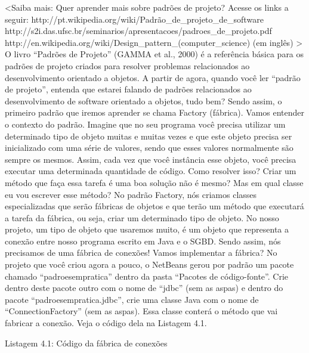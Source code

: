 <Saiba mais:
Quer aprender mais sobre padrões de projeto? Acesse os links a seguir:
http://pt.wikipedia.org/wiki/Padrão\_de\_projeto\_de\_software
http://s2i.das.ufsc.br/seminarios/apresentacoes/padroes\_de\_projeto.pdf
http://en.wikipedia.org/wiki/Design\_pattern\_(computer\_science) (em inglês)
>
O livro “Padrões de Projeto” (GAMMA et al., 2000) é a referência básica para os padrões de projeto criados para resolver problemas relacionados ao desenvolvimento orientado a objetos. A partir de agora, quando você ler “padrão de projeto”, entenda que estarei falando de padrões relacionados ao desenvolvimento de software orientado a objetos, tudo bem? Sendo assim, o primeiro padrão que iremos aprender se chama Factory (fábrica). 
Vamos entender o contexto do padrão. Imagine que no seu programa você precisa utilizar um determinado tipo de objeto muitas e muitas vezes e que este objeto precisa ser inicializado com uma série de valores, sendo que esses valores normalmente são sempre os mesmos. Assim, cada vez que você instância esse objeto, você precisa executar uma determinada quantidade de código. Como resolver isso? Criar um método que faça essa tarefa é uma boa solução não é mesmo? Mas em qual classe eu vou escrever esse método? No padrão Factory, nós criamos classes especializadas que serão fábricas de objetos e que terão um método que executará a tarefa da fábrica, ou seja, criar um determinado tipo de objeto.
No nosso projeto, um tipo de objeto que usaremos muito, é um objeto que representa a conexão entre nosso programa escrito em Java e o SGBD. Sendo assim, nós precisamos de uma fábrica de conexões! Vamos implementar a fábrica? No projeto que você criou agora a pouco, o NetBeans gerou por padrão um pacote chamado “padroesempratica” dentro da pasta “Pacotes de código-fonte”. Crie dentro deste pacote outro com o nome de “jdbc” (sem as aspas) e dentro do pacote “padroesempratica.jdbc”, crie uma classe Java com o nome de “ConnectionFactory” (sem as aspas).
Essa classe conterá o método que vai fabricar a conexão. Veja o código dela na Listagem 4.1.
























Listagem 4.1: Código da fábrica de conexões
 
